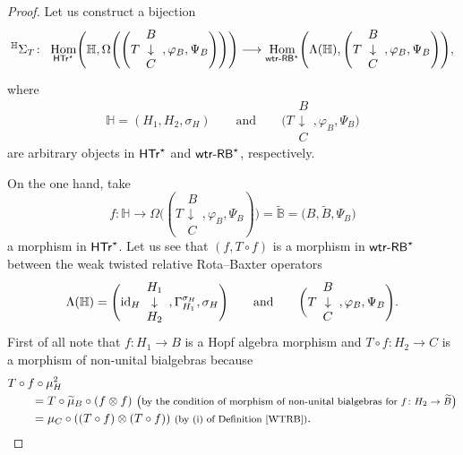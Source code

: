 \documentclass[10pt,a4paper]{amsart}
\numberwithin{equation}{section}
\DeclareMathOperator{\Hom}{Hom}
\begin{document}
\begin{proof}
Let us construct a bijection
\begin{gather*}
{}^{\mathbb{H}}\Sigma_{T}\colon\ \Hom_{{\sf HTr}^{\star}}\Biggl(\mathbb{H},\Omega\Biggl(\Biggl(T\begin{array}{c}B\\\downarrow\\C\end{array},\varphi_{B},\Psi_{B}\Biggr)\Biggr)\Biggr)\longrightarrow \Hom_{{\sf wtr}\textnormal{-}{\sf RB}^{\star}}\Biggl(\Lambda(\mathbb{H}),\Biggl(T\begin{array}{c}B\\\downarrow\\C\end{array},\varphi_{B},\Psi_{B}\Biggr)\Biggr),
\end{gather*}
where
\[
\mathbb{H}=(H_{1},H_{2},\sigma_{H}) \qquad \text{and}\qquad \Biggl(T\begin{array}{c}B\\\downarrow\\C\end{array},\varphi_{B},\Psi_{B}\Biggr)
\]
 are arbitrary objects in ${\sf HTr}^{\star}$ and ${\sf wtr}\textnormal{-}{\sf RB}^{\star}$, respectively.

On the one hand, take
\[
f\colon \mathbb{H}\rightarrow \Omega\Biggl((T\begin{array}{c}B\\\downarrow\\C\end{array},\varphi_{B},\Psi_{B})\Biggr)=\widetilde{\mathbb{B}}=\bigl(B,\widetilde{B},\Psi_{B}\bigr)
\]
 a morphism in ${\sf HTr}^{\star}$. Let us see that $(f,T\circ f)$ is a morphism in ${\sf wtr}\textnormal{-}{\sf RB}^{\star}$ between the weak twisted relative Rota--Baxter operators \[
 \Lambda(\mathbb{H})=\Biggl({\rm id}_{H}\begin{array}{c}H_{1}\\\downarrow\\H_{2}\end{array},\Gamma_{H_{1}}^{\sigma_{H}},\sigma_{H}\Biggr)
 \qquad \text{and} \qquad \biggl(T\begin{array}{c}B\\\downarrow\\C\end{array},\varphi_{B},\Psi_{B}\Biggr).
 \]
 First of all note that $f\colon H_{1}\rightarrow B$ is a Hopf algebra morphism and $T\circ f\colon H_{2}\rightarrow C$ is a morphism of non-unital bialgebras because
\begin{align*}
&T\circ f\circ \mu_{H}^{2}\\
&\qquad{}=T\circ\widetilde{\mu}_{B}\circ (f\otimes f)\
\text{\footnotesize\textnormal{\big(by the condition of morphism of non-unital bialgebras for $f\colon H_{2}\rightarrow \widetilde{B}$\big)}}\\
&\qquad{}=\mu_{C}\circ((T\circ f)\otimes(T\circ f))\ \text{\footnotesize\textnormal{(by (i) of Definition \ref{WTRB})}}.
\end{align*}


\end{proof}
\end{document}
